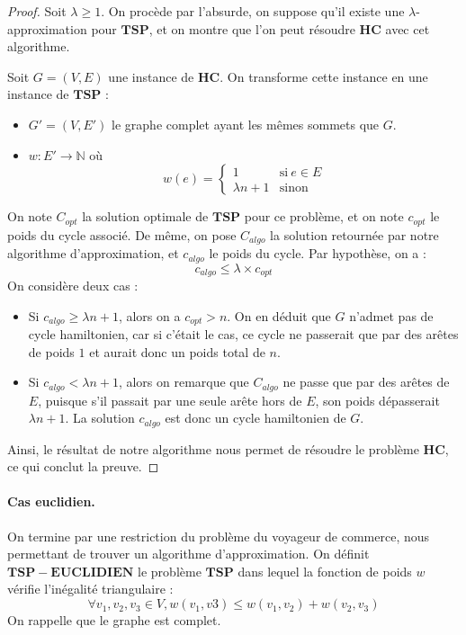\begin{proof} Soit $\lambda \geq 1$.
On procède par l'absurde, on suppose qu'il existe une $\lambda$-approximation pour $\mathbf{TSP}$, et on montre que l'on peut résoudre $\mathbf{HC}$ avec cet algorithme.

Soit $G=(V,E)$ une instance de $\mathbf{HC}$. On transforme cette instance en une instance de $\mathbf{TSP}$ :
\begin{itemize}
\item $G'=(V,E')$ le graphe complet ayant les mêmes sommets que $G$.
\item $w : E' \rightarrow \mathbb{N}$ où 
$$
w(e) = \left\lbrace 
\begin{array}{ll}
1 & \text{si}~ e\in E \\
\lambda n+1 & \text{sinon}
\end{array}
\right.
$$
\end{itemize}

On note $C_{opt}$ la solution optimale de $\mathbf{TSP}$ pour ce problème, et on note $c_{opt}$ le poids du cycle associé. De même, on pose $C_{algo}$ la solution retournée par notre algorithme d'approximation, et $c_{algo}$ le poids du cycle. Par hypothèse, on a :
$$
c_{algo} \leq \lambda \times c_{opt}
$$
On considère deux cas :
\begin{itemize}
\item Si $c_{algo} \geq \lambda n+1$, alors on a $c_{opt} >n$. On en déduit que $G$ n'admet pas de cycle hamiltonien, car si c'était le cas, ce cycle ne passerait que par des arêtes de poids $1$ et aurait donc un poids total de $n$.
\item Si $c_{algo} < \lambda n +1$, alors on remarque que $C_{algo}$ ne passe que par des arêtes de $E$, puisque s'il passait par une seule arête hors de $E$, son poids dépasserait $\lambda n +1$. La solution $c_{algo}$ est donc un cycle hamiltonien de $G$.
\end{itemize}
Ainsi, le résultat de notre algorithme nous permet de résoudre le problème $\mathbf{HC}$, ce qui conclut la preuve.
\end{proof}


\paragraph{Cas euclidien.} On termine par une restriction du problème du voyageur de commerce, nous permettant de trouver un algorithme d'approximation. On définit $\mathbf{TSP-EUCLIDIEN}$ le problème $\mathbf{TSP}$ dans lequel la fonction de poids $w$ vérifie l'inégalité triangulaire :
$$
\forall v_1,v_2,v_3 \in V, w(v_1,v3) \leq w(v_1,v_2)+w(v_2,v_3)
$$
On rappelle que le graphe est complet.

